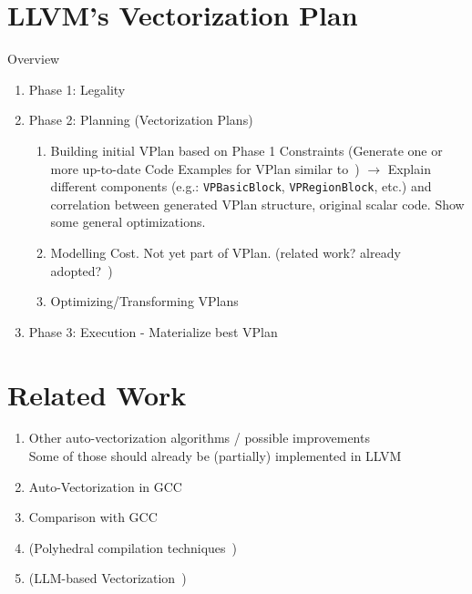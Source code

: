 \documentclass[sigplan,11pt,nonacm]{acmart}
\begin{document}
\section{LLVM's Vectorization Plan}
\label{sec:vplan}
  Overview~\cite{llvmvec,llvmvplan,llvmextloopvec,llvmintrvplan,llvmvplanstate,llvmvplanrv,llvmouterloop,llvmvplanupdate}
\begin{enumerate}
  \item Phase 1: Legality
  \item Phase 2: Planning (Vectorization Plans)
  \begin{enumerate}
    \item Building initial VPlan based on Phase 1 Constraints (Generate one or more up-to-date Code Examples for VPlan similar to~\cite{llvmintrvplan,llvmvplanstate,llvmouterloop})
    $\rightarrow$ Explain different components (e.g.: \texttt{VPBasicBlock}, \texttt{VPRegionBlock}, etc.) and
    correlation between generated VPlan structure, original scalar code. Show some general optimizations.
    \item Modelling Cost. Not yet part of VPlan. (related work? already adopted?~\cite{POHL2020102106})
    \item Optimizing/Transforming VPlans~\cite{llvmvplanupdate}
  \end{enumerate}
  \item Phase 3: Execution - Materialize best VPlan
\end{enumerate}




\section{Related Work}
\label{sec:relatedwork}
\begin{enumerate}
  \item Other auto-vectorization algorithms / possible improvements~\cite{10.5555/3615924.3615932,4336219,llvmveccontrolflow,saarlandrv,10.1145/3303117.3306172}
  \\Some of those should already be (partially) implemented in LLVM
  \item Auto-Vectorization in GCC~\cite{autovecoptgcc, vecoptgcc}
  \item Comparison with GCC~\cite{gccllvmveccomp,10.1155/2021/3264624}
  \item (Polyhedral compilation techniques~\cite{llvmpolyhedral})
  \item (LLM-based Vectorization~\cite{taneja2024llmvectorizerllmbasedverifiedloop})
\end{enumerate}
\end{document}
